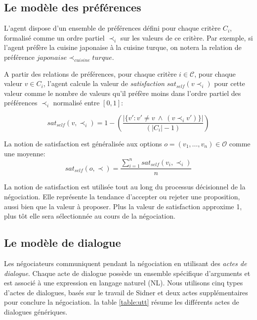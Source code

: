 		\subsection{Le modèle des préférences}
			L'agent dispose d'un ensemble de préférences défini pour chaque critère $C_i$, formalisé comme un ordre partiel $ \prec_i$ sur les valeurs de ce critère. 
			Par exemple, si l'agent préfère la cuisine japonaise à la cuisine turque, on notera la relation de préférence $japonaise \prec_{cuisine} turque$. 
			
			A partir des relations de préférences, pour chaque critère $i\in \mathcal{C}$, pour chaque valeur $v\in C_i$, l'agent calcule la valeur de  \emph{satisfaction} $sat_{self}(v \prec_i)$ pour cette valeur comme le nombre de valeurs qu'il préfère moins dans l'ordre partiel des préférences $\prec_i$ normalisé entre $[0,1]$:
			
					\begin{equation}
					sat_{self}(v, \prec_i) =	1 - \left( \frac{|\{v' : v' \neq v \  \wedge \ (v \prec_i v')\}| }{( |C_i| - 1 )}\right)
					\end{equation}
					
			La notion de satisfaction est généralisée aux options $o= (v_1, \ldots, v_n)\in \mathcal{O}$ comme une moyenne: 
				\begin{equation}
				sat_{self}(o, \prec) = \frac{\sum_{i=1}^{n} sat_{self}(v_i, \prec_i) }{n}
				\end{equation}
				
			La notion de satisfaction est utilisée tout au long du processus décisionnel de la négociation. Elle représente la tendance d'accepter ou rejeter une proposition, aussi bien que la valeur à proposer. Plus la valeur de satisfaction approxime 1, plus tôt elle sera sélectionnée au cours de la négociation.
			 
			 
		\subsection{Le modèle de dialogue}
		\label {sec:com}
		Les négociateurs communiquent pendant la négociation en utilisant des \emph {actes de dialogue}. Chaque acte de dialogue possède un ensemble spécifique d'arguments et est associé à une expression en langage naturel (NL). Nous utilisons cinq types d'actes de dialogues, basés sur le travail de Sidner \cite {sidner1994artificial} et deux actes supplémentaires pour conclure la négociation. la table \ref {table:utt} résume les différents actes de dialogues  génériques. 
		
